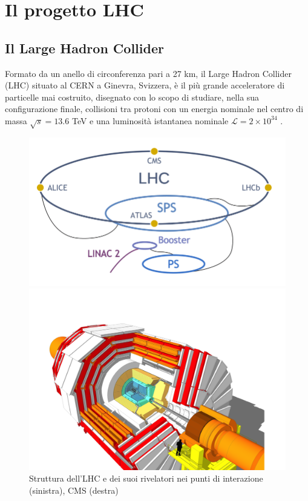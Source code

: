 \chapter{Il progetto LHC}
\label{cap:PrimoCapitolo}

\sloppy
\section{Il Large Hadron Collider}
\label{sec:LHC}
Formato da un anello di circonferenza pari a 27 km, il Large Hadron Collider (LHC) situato al CERN a Ginevra, Svizzera, è il più grande acceleratore di particelle mai costruito, disegnato con lo scopo di studiare, nella sua configurazione finale, collisioni tra protoni con un energia nominale nel centro di massa $\sqrt{s} = 13.6$ TeV e una luminosità istantanea nominale $\mathcal{L} = 2 \times 10^{34}$ \Lumi. 
\begin{figure}[t]
  \centering
  \begin{minipage}[b]{0.43\textwidth}
      \centering
      \includegraphics[width=\textwidth]{../ImmaginiTesi/LHC.png} 
  \end{minipage}
  \hfill 
  \begin{minipage}[b]{0.56\textwidth}
      \centering
      \includegraphics[width=\textwidth]{../ImmaginiTesi/CMS.png} 
  \end{minipage}
  \caption{Struttura dell'LHC e dei suoi rivelatori nei punti di interazione (sinistra), CMS (destra)}
  \label{fig:LHC-CMS}
\end{figure}


